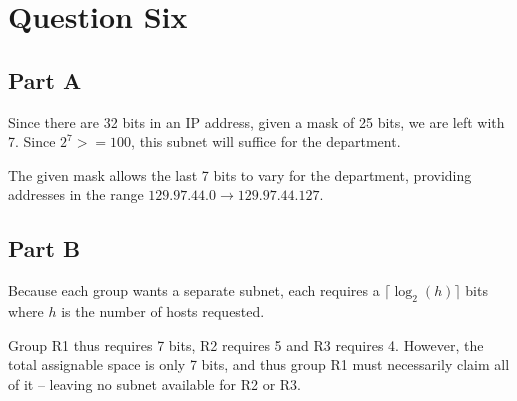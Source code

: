 \documentclass[a4paper]{article}
\begin{document}
\section{Question Six}

\subsection{Part A}

Since there are 32 bits in an IP address, given a mask of 25 bits, we are left with 7. Since $2^7 >= 100$, this subnet will suffice for the department.

The given mask allows the last 7 bits to vary for the department, providing addresses in the range $129.97.44.0 \to 129.97.44.127$.

\subsection{Part B}

Because each group wants a separate subnet, each requires a $\lceil \log_2(h) \rceil$ bits where $h$ is the number of hosts requested.

Group R1 thus requires 7 bits, R2 requires 5 and R3 requires 4. However, the total assignable space is only 7 bits, and thus group R1 must necessarily claim all of it -- leaving no subnet available for R2 or R3.

\end{document}
